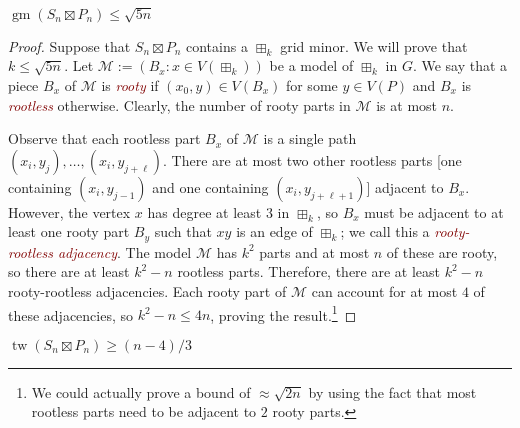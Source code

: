 \documentclass{patmorin}
\newcommand{\defin}[1]{\textcolor{Maroon}{\emph{#1}}}
\DeclareMathOperator{\tw}{tw}
\DeclareMathOperator{\gm}{gm}
\begin{document}
\begin{lem}\label{star_gridminor}
  $\gm(S_n\boxtimes P_n)\le \sqrt{5n}$
\end{lem}

\begin{proof}
  Suppose that $S_n\boxtimes P_n$ contains a $\boxplus_k$ grid minor.  We will prove that $k\le\sqrt{5n}$.  Let $\mathcal{M}:=(B_x:x\in V(\boxplus_k))$ be a model of $\boxplus_k$ in $G$.  We say that a piece $B_x$ of $\mathcal{M}$ is \defin{rooty} if $(x_0,y)\in V(B_x)$ for some $y\in V(P)$ and $B_x$ is \defin{rootless} otherwise.  Clearly, the number of rooty parts in $\mathcal{M}$ is at most $n$.

  Observe that each rootless part $B_x$ of $\mathcal{M}$ is a single path $(x_i,y_j),\ldots,(x_i,y_{j+\ell})$.  There are at most two other rootless parts [one containing $(x_i,y_{j-1})$ and one containing $(x_i,y_{j+\ell+1})$] adjacent to $B_x$.  However, the vertex $x$ has degree at least $3$ in $\boxplus_k$, so $B_x$ must be adjacent to at least one rooty part $B_y$ such that $xy$ is an edge of $\boxplus_k$; we call this a \defin{rooty-rootless adjacency}. The model $\mathcal{M}$ has $k^2$ parts and at most $n$ of these are rooty, so there are at least $k^2-n$ rootless parts.  Therefore, there are at least $k^2-n$ rooty-rootless adjacencies.  Each rooty part of $\mathcal{M}$ can account for at most $4$ of these adjacencies, so $k^2-n \le 4n$, proving the result.\footnote{We could actually prove a bound of $\approx\sqrt{2n}$ by using the fact that most rootless parts need to be adjacent to $2$ rooty parts.}
\end{proof}

\begin{lem}\label{star_treewidth}
  $\tw(S_n\boxtimes P_n) \ge (n-4)/3$
\end{lem}
\end{document}
